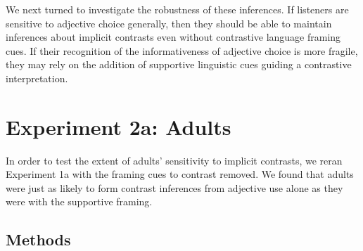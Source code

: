 \documentclass[10pt,letterpaper]{article}
\begin{document}
We next turned to investigate the robustness of these inferences.  If listeners are sensitive to adjective choice generally, then they should be able to maintain inferences about implicit contrasts even without contrastive language framing cues.  If their recognition of the informativeness of adjective choice is more fragile, they may rely on the addition of supportive linguistic cues guiding a contrastive interpretation. 




\section{Experiment 2a: Adults} 


In order to test the extent of adults' sensitivity to implicit contrasts, we reran Experiment 1a with the framing cues to contrast removed.  We found that adults were just as likely to form contrast inferences from adjective use alone as they were with the supportive framing. 

\subsection{Methods}
\end{document}
